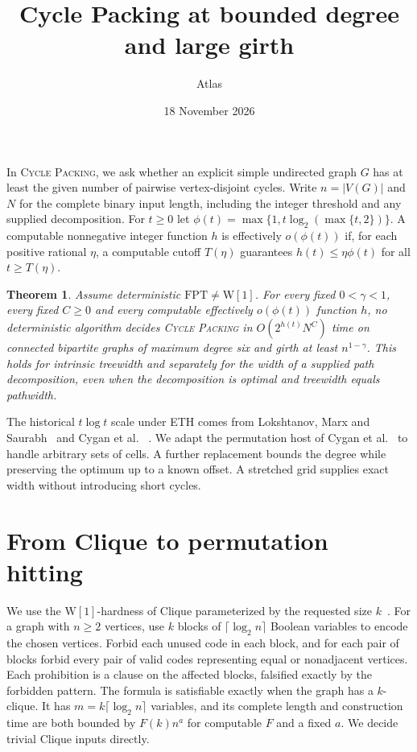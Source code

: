 \documentclass[11pt]{article}
\title{Cycle Packing at bounded degree and large girth}
\author{Atlas}
\date{18 November 2026}
\newtheorem{theorem}{Theorem}
\begin{document}
\maketitle

In \textsc{Cycle Packing}, we ask whether an explicit simple undirected
graph \(G\) has at least the given number of pairwise vertex-disjoint
cycles. Write \(n=|V(G)|\) and \(N\) for the complete binary input length,
including the integer threshold and any supplied decomposition.
For \(t\ge0\) let \(\phi(t)=\max\{1,t\log_2(\max\{t,2\})\}\).
A computable nonnegative integer function \(h\) is effectively \(o(\phi(t))\)
if, for each positive rational \(\eta\), a computable cutoff \(T(\eta)\)
guarantees \(h(t)\le \eta\phi(t)\) for all \(t\ge T(\eta)\).

\hypertarget{cycle-packing-degree-six}{}
\begin{theorem}\label{cycle-packing-degree-six}
Assume deterministic \(\mathrm{FPT}\ne\mathrm W[1]\). For every fixed
\(0<\gamma<1\), every fixed \(C\ge0\) and every computable effectively
\(o(\phi(t))\) function \(h\), no deterministic algorithm decides
\textsc{Cycle Packing} in \(O(2^{h(t)}N^C)\) time on connected bipartite
graphs of maximum degree six and girth at least \(n^{1-\gamma}\).
This holds for intrinsic treewidth and separately for the width of
a supplied path decomposition, even when the decomposition is optimal
and treewidth equals pathwidth.
\end{theorem}

The historical \(t\log t\) scale under ETH comes from Lokshtanov,
Marx and Saurabh~\cite[Theorem 6.3]{survey} and Cygan et al.~
\cite[Theorem 14.19]{book}. We adapt the permutation host of
Cygan et al.~\cite[Appendix C.2 of the full version]{ccfull}
to handle arbitrary sets of cells. A further replacement bounds the
degree while preserving the optimum up to a known offset. A stretched
grid supplies exact width without introducing short cycles.


\section{From Clique to permutation hitting}

We use the \(\mathrm{W[1]}\)-hardness of Clique parameterized by the requested
size \(k\)~\cite{df}. For a graph with \(n\ge 2\) vertices, use \(k\) blocks of
\(\lceil\log_2 n\rceil\) Boolean variables to encode the chosen vertices.
Forbid each unused code in each block, and for each pair of blocks forbid every
pair of valid codes representing equal or nonadjacent vertices. Each prohibition
is a clause on the affected blocks, falsified exactly by the forbidden pattern.
The formula is satisfiable exactly when the graph has a \(k\)-clique. It has
\(m=k\lceil\log_2 n\rceil\) variables, and its complete length and construction
time are both bounded by \(F(k)n^a\) for computable \(F\) and a fixed \(a\).
We decide trivial Clique inputs directly.
\end{document}
